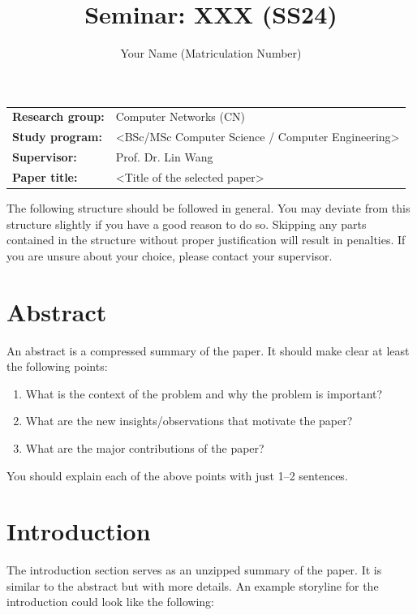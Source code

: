 \documentclass[report]{template-core/upb-cn}
\title{Seminar: XXX (SS24)}
\author{Your Name (Matriculation Number)}
\begin{document}
\makethetitle

\begin{notebox}
    \begin{tabular}{@{}ll}
        \textbf{Research group:} & Computer Networks (CN) \\
        \textbf{Study program:} & <BSc/MSc Computer Science / Computer Engineering> \\
        \textbf{Supervisor:} & Prof. Dr. Lin Wang \\
        \textbf{Paper title:} & <Title of the selected paper>
    \end{tabular}
\end{notebox}

The following structure should be followed in general. You may deviate from this structure slightly if you have a good reason to do so. Skipping any parts contained in the structure without proper justification will result in penalties. If you are unsure about your choice, please contact your supervisor.

\section*{Abstract}

An abstract is a compressed summary of the paper. It should make clear at least the following points:
\begin{enumerate}
    \item What is the context of the problem and why the problem is important?
    \item What are the new insights/observations that motivate the paper?
    \item What are the major contributions of the paper?
\end{enumerate}

You should explain each of the above points with just 1--2 sentences.



\section{Introduction}
\label{sec:introduction}

The introduction section serves as an unzipped summary of the paper. It is similar to the abstract but with more details. An example storyline for the introduction could look like the following:
\end{document}
